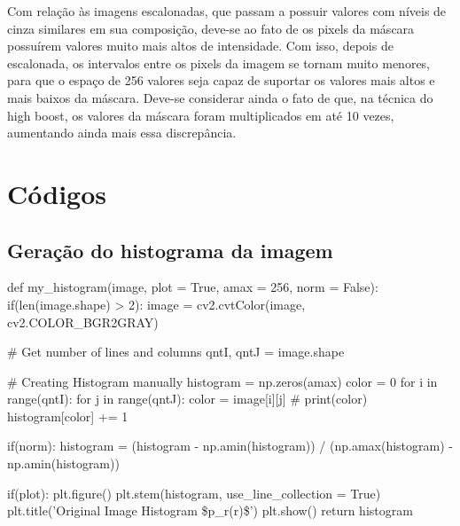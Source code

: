 \documentclass{article}
\begin{document}
Com relação às imagens escalonadas, que passam a possuir valores com níveis de cinza similares em sua composição, deve-se ao fato de os pixels da máscara possuírem valores muito mais altos de intensidade. Com isso, depois de escalonada, os intervalos entre os pixels da imagem se tornam muito menores, para que o espaço de 256 valores seja capaz de suportar os valores mais altos e mais baixos da máscara. Deve-se considerar ainda o fato de que, na técnica do high boost, os valores da máscara foram multiplicados em até 10 vezes, aumentando ainda mais essa discrepância. 

\newpage
\onecolumn
\section{Códigos}

\subsection{Geração do histograma da imagem}
\label{cod:hist}
\begin{python}
def my_histogram(image, plot = True, amax = 256, norm = False):
	if(len(image.shape) > 2):
	image = cv2.cvtColor(image, cv2.COLOR\_BGR2GRAY)
	
	# Get number of lines and columns
	qntI, qntJ = image.shape
	
	# Creating Histogram manually
	histogram = np.zeros(amax)
	color = 0
	for i in range(qntI):
		for j in range(qntJ):
			color = image[i][j]
			\# print(color)
			histogram[color] += 1
	
	if(norm):
		histogram = (histogram - np.amin(histogram)) /  (np.amax(histogram) - np.amin(histogram))
	
	if(plot):
		plt.figure()
		plt.stem(histogram, use\_line\_collection = True)
		plt.title('Original Image Histogram \$p\_r(r)\$')
		plt.show()
	return histogram
\end{python}

\newpage
\end{document}
